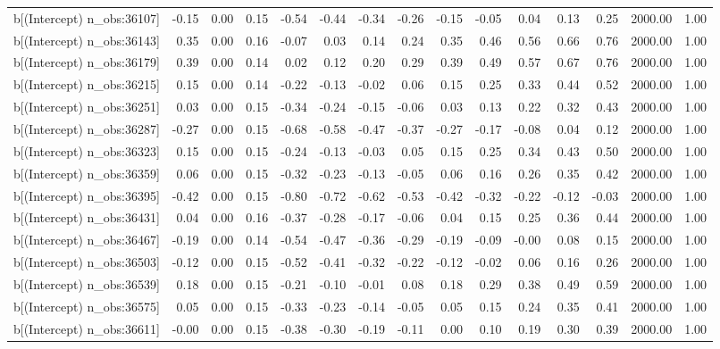 \begin{table}[ht]
\begin{tabular}{rrrrrrrrrrrrrrr}
  b[(Intercept) n\_obs:36107] & -0.15 & 0.00 & 0.15 & -0.54 & -0.44 & -0.34 & -0.26 & -0.15 & -0.05 & 0.04 & 0.13 & 0.25 & 2000.00 & 1.00 \\ 
  b[(Intercept) n\_obs:36143] & 0.35 & 0.00 & 0.16 & -0.07 & 0.03 & 0.14 & 0.24 & 0.35 & 0.46 & 0.56 & 0.66 & 0.76 & 2000.00 & 1.00 \\ 
  b[(Intercept) n\_obs:36179] & 0.39 & 0.00 & 0.14 & 0.02 & 0.12 & 0.20 & 0.29 & 0.39 & 0.49 & 0.57 & 0.67 & 0.76 & 2000.00 & 1.00 \\ 
  b[(Intercept) n\_obs:36215] & 0.15 & 0.00 & 0.14 & -0.22 & -0.13 & -0.02 & 0.06 & 0.15 & 0.25 & 0.33 & 0.44 & 0.52 & 2000.00 & 1.00 \\ 
  b[(Intercept) n\_obs:36251] & 0.03 & 0.00 & 0.15 & -0.34 & -0.24 & -0.15 & -0.06 & 0.03 & 0.13 & 0.22 & 0.32 & 0.43 & 2000.00 & 1.00 \\ 
  b[(Intercept) n\_obs:36287] & -0.27 & 0.00 & 0.15 & -0.68 & -0.58 & -0.47 & -0.37 & -0.27 & -0.17 & -0.08 & 0.04 & 0.12 & 2000.00 & 1.00 \\ 
  b[(Intercept) n\_obs:36323] & 0.15 & 0.00 & 0.15 & -0.24 & -0.13 & -0.03 & 0.05 & 0.15 & 0.25 & 0.34 & 0.43 & 0.50 & 2000.00 & 1.00 \\ 
  b[(Intercept) n\_obs:36359] & 0.06 & 0.00 & 0.15 & -0.32 & -0.23 & -0.13 & -0.05 & 0.06 & 0.16 & 0.26 & 0.35 & 0.42 & 2000.00 & 1.00 \\ 
  b[(Intercept) n\_obs:36395] & -0.42 & 0.00 & 0.15 & -0.80 & -0.72 & -0.62 & -0.53 & -0.42 & -0.32 & -0.22 & -0.12 & -0.03 & 2000.00 & 1.00 \\ 
  b[(Intercept) n\_obs:36431] & 0.04 & 0.00 & 0.16 & -0.37 & -0.28 & -0.17 & -0.06 & 0.04 & 0.15 & 0.25 & 0.36 & 0.44 & 2000.00 & 1.00 \\ 
  b[(Intercept) n\_obs:36467] & -0.19 & 0.00 & 0.14 & -0.54 & -0.47 & -0.36 & -0.29 & -0.19 & -0.09 & -0.00 & 0.08 & 0.15 & 2000.00 & 1.00 \\ 
  b[(Intercept) n\_obs:36503] & -0.12 & 0.00 & 0.15 & -0.52 & -0.41 & -0.32 & -0.22 & -0.12 & -0.02 & 0.06 & 0.16 & 0.26 & 2000.00 & 1.00 \\ 
  b[(Intercept) n\_obs:36539] & 0.18 & 0.00 & 0.15 & -0.21 & -0.10 & -0.01 & 0.08 & 0.18 & 0.29 & 0.38 & 0.49 & 0.59 & 2000.00 & 1.00 \\ 
  b[(Intercept) n\_obs:36575] & 0.05 & 0.00 & 0.15 & -0.33 & -0.23 & -0.14 & -0.05 & 0.05 & 0.15 & 0.24 & 0.35 & 0.41 & 2000.00 & 1.00 \\ 
  b[(Intercept) n\_obs:36611] & -0.00 & 0.00 & 0.15 & -0.38 & -0.30 & -0.19 & -0.11 & 0.00 & 0.10 & 0.19 & 0.30 & 0.39 & 2000.00 & 1.00 \\ 

\end{tabular}
\end{table}
